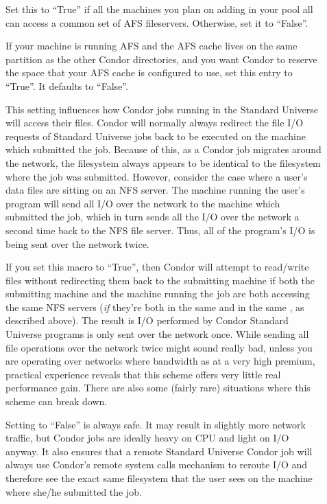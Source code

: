 \begin{description}
\item[] \label{param:HasAfs} Set this to ``True'' if
  all the machines you plan on adding in your pool all can access a
  common set of AFS fileservers.  Otherwise, set it to ``False''.
      
\item[] \label{param:ReserveAfsCache} If
  your machine is running AFS and the AFS cache lives on the same
  partition as the other Condor directories, and you want Condor to
  reserve the space that your AFS cache is configured to use, set this
  entry to ``True''.  It defaults to ``False''.
  
\item[] \label{param:UseNfs} This setting influences
  how Condor jobs running in the Standard Universe will access their
  files.  Condor will normally always redirect the file I/O requests
  of Standard Universe jobs back to be executed on the machine which
  submitted the job.  Because of this, as a Condor job migrates around
  the network, the filesystem always appears to be identical to the
  filesystem where the job was submitted.  However, consider the case
  where a user's data files are sitting on an NFS server. The machine
  running the user's program will send all I/O over the network to the
  machine which submitted the job, which in turn sends all the I/O
  over the network a second time back to the NFS file server. Thus,
  all of the program's I/O is being sent over the network twice.
          
  If you set this macro to ``True'', then Condor will attempt to
  read/write files without redirecting them back to the submitting
  machine if both the submitting machine and the machine running the job
  are both accessing the same NFS servers (\emph{if} they're both in the
  same  and in the same ,
  as described above).  The result is I/O performed by Condor Standard
  Universe programs is only sent over the network once.  
  While sending all file operations over the network twice might sound
  really bad, unless you are operating over networks where bandwidth
  as at a very high premium, practical experience reveals that this
  scheme offers very little real performance gain.  There are also
  some (fairly rare) situations where this scheme can break down.
  
  Setting  to ``False'' is always safe.  It may result
  in slightly more network traffic, but Condor jobs are ideally heavy
  on CPU and light on I/O anyway.  It also ensures that a remote
  Standard Universe Condor job will always use Condor's remote system
  calls mechanism to reroute I/O and therefore see the exact same
  filesystem that the user sees on the machine where she/he submitted
  the job.
  

\end{description}
